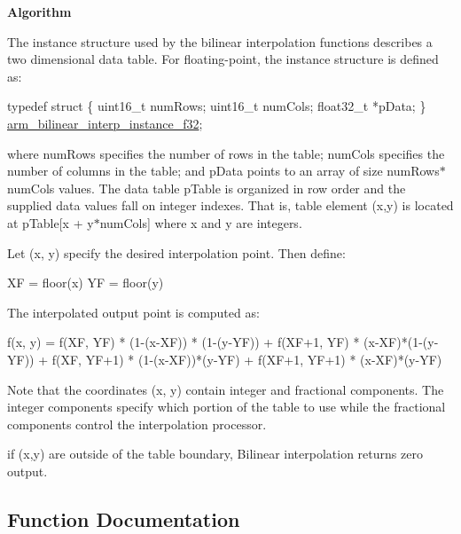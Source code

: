 {\bfseries Algorithm} \begin{DoxyParagraph}{}
The instance structure used by the bilinear interpolation functions describes a two dimensional data table. For floating-\/point, the instance structure is defined as\+: 
\begin{DoxyPre}
  typedef struct
  \{
    uint16\_t numRows;
    uint16\_t numCols;
    float32\_t *pData;
\} \hyperlink{structarm__bilinear__interp__instance__f32}{arm\_bilinear\_interp\_instance\_f32};
\end{DoxyPre}

\end{DoxyParagraph}
\begin{DoxyParagraph}{}
where {\ttfamily num\+Rows} specifies the number of rows in the table; {\ttfamily num\+Cols} specifies the number of columns in the table; and {\ttfamily p\+Data} points to an array of size {\ttfamily num\+Rows$\ast$num\+Cols} values. The data table {\ttfamily p\+Table} is organized in row order and the supplied data values fall on integer indexes. That is, table element (x,y) is located at {\ttfamily p\+Table\mbox{[}x + y$\ast$num\+Cols\mbox{]}} where x and y are integers.
\end{DoxyParagraph}
\begin{DoxyParagraph}{}
Let {\ttfamily (x, y)} specify the desired interpolation point. Then define\+: 
\begin{DoxyPre}
    XF = floor(x)
    YF = floor(y)
\end{DoxyPre}
 
\end{DoxyParagraph}
\begin{DoxyParagraph}{}
The interpolated output point is computed as\+: 
\begin{DoxyPre}
 f(x, y) = f(XF, YF) * (1-(x-XF)) * (1-(y-YF))
          + f(XF+1, YF) * (x-XF)*(1-(y-YF))
          + f(XF, YF+1) * (1-(x-XF))*(y-YF)
          + f(XF+1, YF+1) * (x-XF)*(y-YF)
\end{DoxyPre}
 Note that the coordinates (x, y) contain integer and fractional components. The integer components specify which portion of the table to use while the fractional components control the interpolation processor.
\end{DoxyParagraph}
\begin{DoxyParagraph}{}
if (x,y) are outside of the table boundary, Bilinear interpolation returns zero output. 
\end{DoxyParagraph}


\subsection{Function Documentation}
